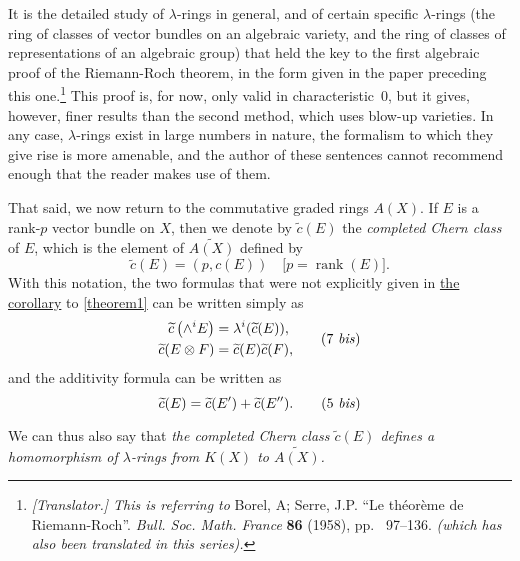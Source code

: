 \documentclass{article}
\theoremstyle{plain}
\theoremstyle{definition}
\DeclareMathOperator{\rank}{rank}
\newcommand{\oldpage}[1]{\marginpar{\footnotesize$\Big\vert$ \textit{p.~#1}}}
\begin{document}
\begin{enumerate}
    \renewcommand*{\thefootnote}{*}
    It is the detailed study of $\lambda$-rings in general, and of certain specific $\lambda$-rings (the ring of classes of vector bundles on an algebraic variety, and the ring of classes of representations of an algebraic group) that held the key to the first algebraic proof of the Riemann-Roch theorem, in the form given in the paper preceding this one.\footnote{\emph{[Translator.] This is referring to} {\sc Borel, A; Serre, J.P.} ``Le th\'{e}or\`{e}me de Riemann-Roch''. \emph{Bull. Soc. Math. France} {\bf 86} (1958), pp.~  97--136. \emph{(which has also been translated in this series).}}
    This proof is, for now, only valid in characteristic~$0$, but it gives, however, finer results than the second method, which uses blow-up varieties.
    In any case, $\lambda$-rings exist in large numbers in nature, the formalism to which they give rise is more amenable, and the author of these sentences cannot recommend enough that the reader makes use of them.

    That said, we now return to the commutative graded rings $A(X)$.
    If $E$ is a rank-$p$ vector bundle on $X$, then we denote by $\widetilde{c}(E)$ the \emph{completed Chern class} of $E$, which is the element of $\widetilde{A(X)}$ defined by
    \[
    \label{equation14}
      \widetilde{c}(E) = (p,c(E))
      \quad\mbox{[$p=\rank(E)$].}
    \tag{14}
    \]
    With this notation, the two formulas that were not explicitly given in \hyperref[theorem1corollary]{the corollary} to \cref{theorem1} can be written simply as
    \[
    \label{equation7bis}
      \begin{aligned}
        \widetilde{c}\left(\wedge^i E\right) &= \lambda^i(\widetilde{c}(E)),
      \\\widetilde{c}(E\otimes F) &= \widetilde{c}(E)\widetilde{c}(F),
      \end{aligned}
    \tag{7 \emph{bis}}
    \]
    and the additivity formula can be written as
    \[
    \label{equation5bis}
      \widetilde{c}(E) = \widetilde{c}(E') + \widetilde{c}(E'').
    \tag{5 \emph{bis}}
    \]

\oldpage{150}
    We can thus also say that \emph{the completed Chern class $\widetilde{c}(E)$ defines a homomorphism of $\lambda$-rings from $K(X)$ to $\widetilde{A(X)}$.}


\end{enumerate}
\end{document}
